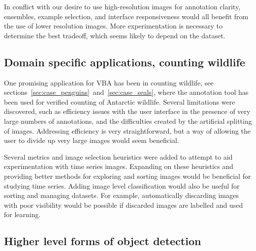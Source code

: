 In conflict with our desire to use high-resolution images for annotation clarity, ensembles, example selection, and interface responsiveness would all benefit from the use of lower resolution images. More experimentation is necessary to determine the best tradeoff, which seems likely to depend on the dataset.

\subsection{Domain specific applications, counting wildlife}

One promising application for \gls{VBA} has been in counting wildlife, see sections~\ref{sec:case_penguins}~and~\ref{sec:case_seals}, where the annotation tool has been used for verified counting of Antarctic wildlife. Several limitations were discovered, such as efficiency issues with the user interface in the presence of very large numbers of annotations, and the difficulties created by the artificial splitting of images. Addressing efficiency is very straightforward, but a way of allowing the user to divide up very large images would seem beneficial.

Several metrics and image selection heuristics were added to attempt to aid experimentation with time series images. Expanding on these heuristics and providing better methods for exploring and sorting images would be beneficial for studying time series. Adding image level classification would also be useful for sorting and managing datasets. For example, automatically discarding images with poor visibility would be possible if discarded images are labelled and used for learning.

\subsection{Higher level forms of object detection}


